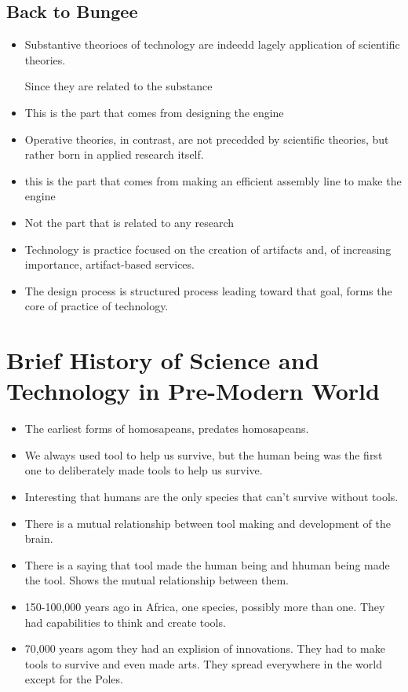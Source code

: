 \documentclass{article}
\begin{document}
\subsection{Back to Bungee}
\begin{itemize}
  \item Substantive theorioes of technology are indeedd
    lagely application of scientific theories.

    Since they are related to the substance
  \item This is the part that comes from designing the engine
  \item Operative theories, in contrast, are not
    precedded by scientific theories, but rather
    born in applied research itself.
  \item  this is the part that comes
    from making an efficient assembly line to make
    the engine
  \item Not the part that is related to any research
  \item Technology is practice focused on the
    creation of artifacts and, of increasing importance,
    artifact-based services.
  \item The design process is structured process
    leading toward that goal, forms
    the core of practice of technology.
\end{itemize}

\section{Brief History of Science and Technology in Pre-Modern World}

\begin{itemize}
  \item The earliest forms of homosapeans, predates
    homosapeans.
  \item We always used tool to help us survive, but
    the human being was the first one to deliberately made
    tools to help us survive.
  \item Interesting that humans are the only species
    that can't survive without tools.
  \item There is a mutual relationship between
    tool making and development of the brain.
  \item There is a saying that tool made the human being
    and hhuman being made the tool.
    Shows the mutual relationship between them.
  \item 150-100,000 years ago in Africa, one species,
    possibly more than one.
    They had capabilities to think and create tools.
  \item 70,000 years agom they had an explision of innovations.
    They had to make tools to survive and even made arts.
    They spread everywhere in the world except for the Poles.

\end{itemize}
\end{document}
